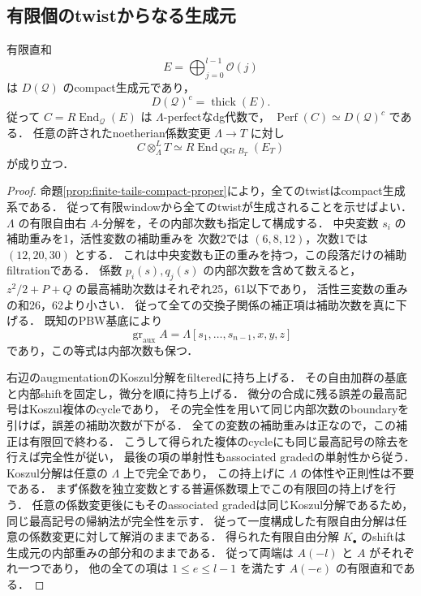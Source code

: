\subsection{有限個のtwistからなる生成元}
\begin{proposition}[有限windowとproperなdg模型]
\label{prop:finite-window-proper}
有限直和
\[
 E=\bigoplus_{j=0}^{l-1}\mathcal O(j)
\]
は $D(\mathcal Q)$ のcompact生成元であり，
\[
 D(\mathcal Q)^c=\operatorname{thick}(E).
\]
従って $C=R\!\operatorname{End}_{\mathcal Q}(E)$ は $\Lambda$-perfectなdg代数で，
$\operatorname{Perf}(C)\simeq D(\mathcal Q)^c$ である．
任意の許されたnoetherian係数変更 $\Lambda\to T$ に対し
\[
 C\otimes_\Lambda^L T
   \simeq R\!\operatorname{End}_{\operatorname{QGr}B_T}(E_T)
\]
が成り立つ．
\end{proposition}
\begin{proof}
命題\ref{prop:finite-tails-compact-proper}により，全てのtwistはcompact生成系である．
従って有限windowから全てのtwistが生成されることを示せばよい．
$\Lambda$ の有限自由右 $A$-分解を，その内部次数も指定して構成する．
中央変数 $s_i$ の補助重みを1，活性変数の補助重みを
次数2では $(6,8,12)$，次数1では $(12,20,30)$ とする．
これは中央変数も正の重みを持つ，この段落だけの補助filtrationである．
係数 $p_i(s),q_j(s)$ の内部次数を含めて数えると，
$z^2/2+P+Q$ の最高補助次数はそれぞれ25，61以下であり，
活性三変数の重みの和26，62より小さい．
従って全ての交換子関係の補正項は補助次数を真に下げる．
既知のPBW基底により
\[
 \operatorname{gr}_{\mathrm{aux}} A
   =\Lambda[s_1,\ldots,s_{n-1},x,y,z]
\]
であり，この等式は内部次数も保つ．

右辺のaugmentationのKoszul分解をfilteredに持ち上げる．
その自由加群の基底と内部shiftを固定し，微分を順に持ち上げる．
微分の合成に残る誤差の最高記号はKoszul複体のcycleであり，
その完全性を用いて同じ内部次数のboundaryを引けば，誤差の補助次数が下がる．
全ての変数の補助重みは正なので，この補正は有限回で終わる．
こうして得られた複体のcycleにも同じ最高記号の除去を行えば完全性が従い，
最後の項の単射性もassociated gradedの単射性から従う．
Koszul分解は任意の $\Lambda$ 上で完全であり，
この持上げに $\Lambda$ の体性や正則性は不要である．
まず係数を独立変数とする普遍係数環上でこの有限回の持上げを行う．
任意の係数変更後にもそのassociated gradedは同じKoszul分解であるため，
同じ最高記号の帰納法が完全性を示す．
従って一度構成した有限自由分解は任意の係数変更に対して解消のままである．
得られた有限自由分解 $K_\bullet$ のshiftは生成元の内部重みの部分和のままである．
従って両端は $A(-l)$ と $A$ がそれぞれ一つであり，
他の全ての項は $1\le e\le l-1$ を満たす $A(-e)$ の有限直和である．


\end{proof}
